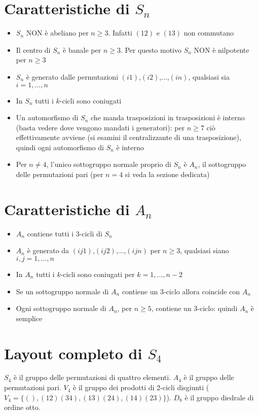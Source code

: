 \documentclass[a4paper,NoNotes,GeneralMath]{stdmdoc}
\begin{document}
	\section*{Caratteristiche di $S_n$}
	\begin{itemize}
		\item $S_n$ NON è abeliano per $n \ge 3$. Infatti $(1 2)$ e $(1 3)$ non commutano
		\item Il centro di $S_n$ è banale per $n \ge 3$. Per questo motivo $S_n$ NON è nilpotente per $n \ge 3$
		\item $S_n$ è generato dalle permutazioni $(i 1)$,$(i 2)$,...,$(i n)$, qualsiasi sia $i = {1,...,n}$
		\item In $S_n$ tutti i $k$-cicli sono coniugati
		\item Un automorfismo di $S_n$ che manda trasposizioni in trasposizioni è interno (basta vedere dove vengono mandati i generatori): per $n \ge 7$ ciò effettivamente avviene (si esamini il 			centralizzante di una trasposizione), quindi ogni automorfismo di $S_n$ è interno
		\item Per $n \ne 4$, l'unico sottogruppo normale proprio di $S_n$ è $A_n$, il sottogruppo delle permutazioni pari (per $n=4$ si veda la sezione dedicata)
	\end{itemize}

	\section*{Caratteristiche di $A_n$}
	\begin{itemize}
		\item $A_n$ contiene tutti i $3$-cicli di $S_n$
		\item $A_n$ è generato da $(i j 1)$,$(i j 2)$,...,$(i j n)$ per $n \ge 3$, qualsiasi siano $i,j = {1,...,n}$
		\item In $A_n$ tutti i $k$-cicli sono coniugati per $k = {1,...,n-2}$
		\item Se un sottogruppo normale di $A_n$ contiene un $3$-ciclo allora coincide con $A_n$
		\item Ogni sottogruppo normale di $A_n$, per $n \ge 5$, contiene un $3$-ciclo: quindi $A_n$ è semplice
	\end{itemize}

	\section*{Layout completo di $S_4$}
	$S_4$ è il gruppo delle permutazioni di quattro elementi. $A_4$ è il gruppo delle permutazioni pari. $V_4$ è il gruppo dei prodotti di 2-cicli disgiunti ($V_4 = \{(), (12)(34), (13)(24), (14)(23)\}$). $D_8$ è il gruppo diedrale di ordine otto.
\end{document}
